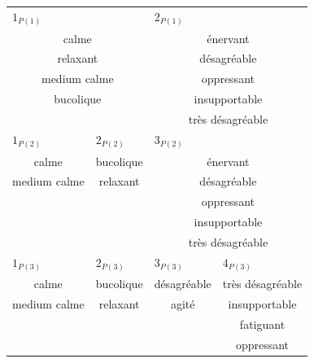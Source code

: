 \begin{table}[t]
\centering
\tiny
\begin{tabular}{c|c|c|c|c|c|c}
\multicolumn{3}{l|}{$1_{P(1)}$}   & \multicolumn{4}{l}{$2_{P(1)}$} \\
\multicolumn{3}{c|}{calme}        & \multicolumn{4}{c}{énervant} \\
\multicolumn{3}{c|}{relaxant}     & \multicolumn{4}{c}{désagréable} \\
\multicolumn{3}{c|}{medium calme} & \multicolumn{4}{c}{oppressant} \\
\multicolumn{3}{c|}{bucolique}      & \multicolumn{4}{c}{insupportable} \\
\multicolumn{3}{c|}{}             & \multicolumn{4}{c}{très désagréable} \\                                            
\hline
\multicolumn{2}{l|}{$1_{P(2)}$}   & \multicolumn{1}{l|}{$2_{P(2)}$} & \multicolumn{4}{l}{$3_{P(2)}$} \\
\multicolumn{2}{c|}{calme}        & bucolique   & \multicolumn{4}{c}{énervant} \\
\multicolumn{2}{c|}{medium calme} & relaxant  & \multicolumn{4}{c}{désagréable} \\
\multicolumn{2}{c|}{}             &           & \multicolumn{4}{c}{oppressant} \\
\multicolumn{2}{c|}{}             &           & \multicolumn{4}{c}{insupportable} \\	
\multicolumn{2}{c|}{}             &           & \multicolumn{4}{c}{très désagréable} \\	
\hline
\multicolumn{2}{l|}{$1_{P(3)}$} & \multicolumn{1}{l|}{$2_{P(3)}$} & \multicolumn{3}{l|}{$3_{P(3)}$} & \multicolumn{1}{l}{$4_{P(3)}$} \\ 
\multicolumn{2}{c|}{calme}        & bucolique  & \multicolumn{3}{c|}{désagréable} & très désagréable \\         
\multicolumn{2}{c|}{medium calme} & relaxant & \multicolumn{3}{c|}{agité}   & insupportable\\ 
\multicolumn{2}{c|}{}            &          & \multicolumn{3}{c|}{}           & fatiguant \\ 
\multicolumn{2}{c|}{}            &          & \multicolumn{3}{c|}{}           & oppressant \\ 
                

\end{tabular}
\end{table}
